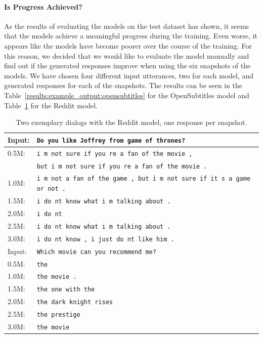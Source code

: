 
\paragraph{Is Progress Achieved?} As the results of evaluating the models on the test dataset has shown, it seems that the models achieve a meaningful progress during the training. Even worse, it appears like the models have become poorer over the course of the training. For this reason, we decided that we would like to evaluate the model manually and find out if the generated responses improve when using the six snapshots of the models. We have chosen four different input utterances, two for each model, and generated responses for each of the snapshots. The results can be seen in the Table~\ref{results:example_output:opensubtitles} for the OpenSubtitles model and Table~\ref{results:example_output:reddit} for the Reddit model.

\begin{table}[H]
	\centering
	\begin{adjustbox}{max width=\textwidth}
		\begin{tabularx}{\textwidth}{lX}
			\toprule
			Input: 	& \texttt{Do you like Joffrey from game of thrones?}\\
			\midrule
			0.5M: 	& \texttt{i m not sure if you re a fan of the movie ,}\\
			& \texttt{but i m not sure if you re a fan of the movie .}\\
			1.0M: 	& \texttt{i m not a fan of the game , but i m not sure if it s a game or not .}\\
			1.5M:	& \texttt{i do nt know what i m talking about .}\\
			2.0M:	& \texttt{i do nt }\\
			2.5M:	& \texttt{i do nt know what i m talking about .}\\
			3.0M:	& \texttt{i do nt know , i just do nt like him .}\\
			\midrule
			Input: 	& \texttt{Which movie can you recommend me?}\\
			\midrule
			0.5M: 	& \texttt{the}\\
			1.0M: 	& \texttt{the movie .}\\
			1.5M:	& \texttt{the one with the}\\
			2.0M:	& \texttt{the dark knight rises}\\
			2.5M:	& \texttt{the prestige}\\
			3.0M:	& \texttt{the movie}\\
			\bottomrule
		\end{tabularx}
	\end{adjustbox}
	\caption{Two exemplary dialogs with the Reddit model, one response per snapshot.}
	\label{results:example_output:reddit}
\end{table}

